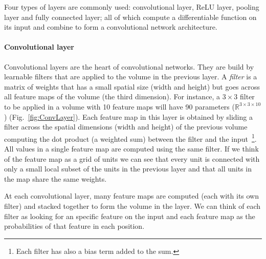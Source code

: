Four types of layers are commonly used: convolutional layer, ReLU layer, pooling layer and fully connected layer; all of which compute a differentiable function on its input and combine to form a convolutional network architecture.

\paragraph{Convolutional layer} Convolutional layers are the heart of convolutional networks. They are build by learnable filters that are applied to the volume in the previous layer. A \emph{filter} is a matrix of weights that has a small spatial size (width and height) but goes across all feature maps of the volume (the third dimension). For instance, a $3\times 3$ filter to be applied in a volume with 10 feature maps will have 90 parameters ($\mathbb{R}^{3\times3\times10}$) (Fig.~\ref{fig:ConvLayer}). Each feature map in this layer is obtained by sliding a filter across the spatial dimensions (width and height) of the previous volume computing the dot product (a weighted sum) between the filter and the input~\footnote{Each filter has also a bias term added to the sum.}. All values in a single feature map are computed using the same filter. If we think of the feature map as a grid of units we can see that every unit is connected with only a small local subset of the units in the previous layer and that all units in the map share the same weights. 

At each convolutional layer, many feature maps are computed (each with its own filter) and stacked together to form the volume in the layer. We can think of each filter as looking for an specific feature on the input and each feature map as the probabilities of that feature in each position.

